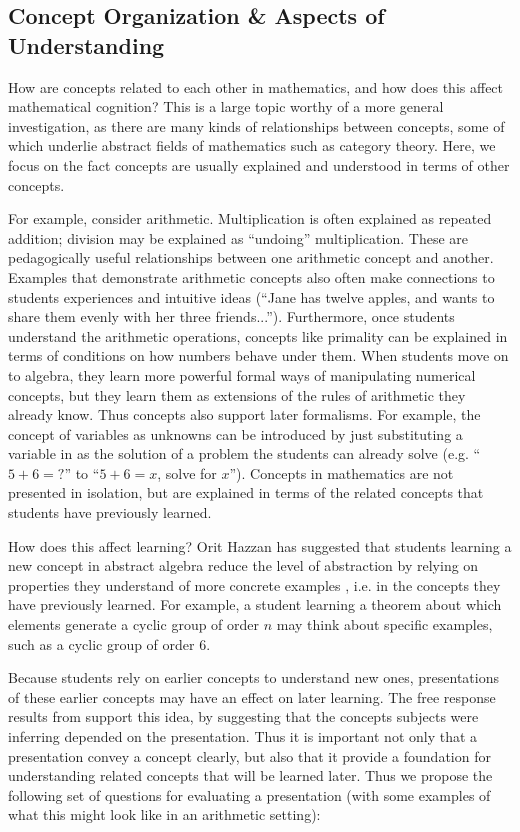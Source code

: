 \documentclass[man,10pt]{apa6}
\begin{document}
\subsection{Concept Organization \& Aspects of Understanding} %
How are concepts related to each other in mathematics, and how does this affect mathematical cognition? This is a large topic worthy of a more general investigation, as there are many kinds of relationships between concepts, some of which underlie abstract fields of mathematics such as category theory. Here, we focus on the fact concepts are usually explained and understood in terms of other concepts.\par
For example, consider arithmetic. Multiplication is often explained as repeated addition; division may be explained as ``undoing'' multiplication. These are pedagogically useful relationships between one arithmetic concept and another. Examples that demonstrate arithmetic concepts also often make connections to students experiences and intuitive ideas (``Jane has twelve apples, and wants to share them evenly with her three friends...''). Furthermore, once students understand the arithmetic operations, concepts like primality can be explained in terms of conditions on how numbers behave under them. When students move on to algebra, they learn more powerful formal ways of manipulating numerical concepts, but they learn them as extensions of the rules of arithmetic they already know. Thus concepts also support later formalisms. For example, the concept of variables as unknowns can be introduced by just substituting a variable in as the solution of a problem the students can already solve (e.g. ``$5+6=?$'' to ``$5+6=x$, solve for $x$''). Concepts in mathematics are not presented in isolation, but are explained in terms of the related concepts that students have previously learned. \par 
How does this affect learning? Orit Hazzan has suggested that students learning a new concept in abstract algebra reduce the level of abstraction by relying on properties they understand of more concrete examples \cite{Hazzan1999}, i.e. in the concepts they have previously learned. For example, a student learning a theorem about which elements generate a cyclic group of order $n$ may think about specific examples, such as a cyclic group of order 6. \par 
Because students rely on earlier concepts to understand new ones, presentations of these earlier concepts may have an effect on later learning. The free response results from  support this idea, by suggesting that the concepts subjects were inferring depended on the presentation. Thus it is important not only that a presentation convey a concept clearly, but also that it provide a foundation for understanding related concepts that will be learned later. Thus we propose the following set of questions for evaluating a presentation (with some examples of what this might look like in an arithmetic setting):
\end{document}
